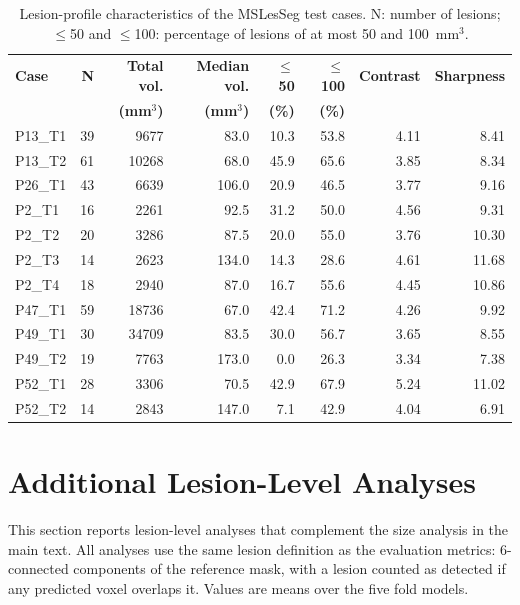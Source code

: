 \begin{table}[H]
\centering
\caption{Lesion-profile characteristics of the MSLesSeg test cases. N:
number of lesions; $\leq$50 and $\leq$100: percentage of lesions of at most
50 and 100~mm$^3$.}
\label{tab:test_case_lesion_profile}
\begin{tabular}{lrrrrrrr}
\toprule
\textbf{Case} & \textbf{N} & \textbf{Total vol.} & \textbf{Median vol.}
& \textbf{$\leq$50} & \textbf{$\leq$100} & \textbf{Contrast} & \textbf{Sharpness} \\
& & \textbf{(mm$^3$)} & \textbf{(mm$^3$)} & \textbf{(\%)} & \textbf{(\%)} & & \\
\midrule
P13\_T1 & 39 & 9677 & 83.0 & 10.3 & 53.8 & 4.11 & 8.41 \\
P13\_T2 & 61 & 10268 & 68.0 & 45.9 & 65.6 & 3.85 & 8.34 \\
P26\_T1 & 43 & 6639 & 106.0 & 20.9 & 46.5 & 3.77 & 9.16 \\
P2\_T1  & 16 & 2261 & 92.5 & 31.2 & 50.0 & 4.56 & 9.31 \\
P2\_T2  & 20 & 3286 & 87.5 & 20.0 & 55.0 & 3.76 & 10.30 \\
P2\_T3  & 14 & 2623 & 134.0 & 14.3 & 28.6 & 4.61 & 11.68 \\
P2\_T4  & 18 & 2940 & 87.0 & 16.7 & 55.6 & 4.45 & 10.86 \\
P47\_T1 & 59 & 18736 & 67.0 & 42.4 & 71.2 & 4.26 & 9.92 \\
P49\_T1 & 30 & 34709 & 83.5 & 30.0 & 56.7 & 3.65 & 8.55 \\
P49\_T2 & 19 & 7763 & 173.0 & 0.0 & 26.3 & 3.34 & 7.38 \\
P52\_T1 & 28 & 3306 & 70.5 & 42.9 & 67.9 & 5.24 & 11.02 \\
P52\_T2 & 14 & 2843 & 147.0 & 7.1 & 42.9 & 4.04 & 6.91 \\
\bottomrule
\end{tabular}
\end{table}

\section{Additional Lesion-Level Analyses}
\label{appendix:lesion-level-analyses}

This section reports lesion-level analyses that complement the size
analysis in the main text. All analyses use the same lesion definition as
the evaluation metrics: 6-connected components of the reference mask, with
a lesion counted as detected if any predicted voxel overlaps it. Values are
means over the five fold models.

